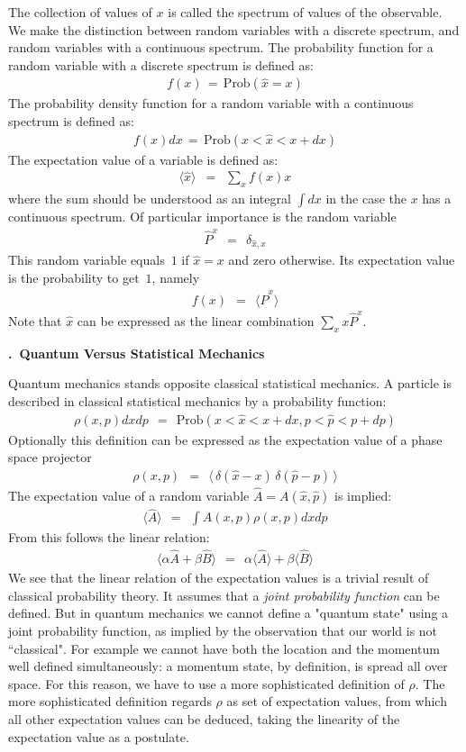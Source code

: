 \documentclass[onecolumn,fleqn, 11pt]{revtex4}
\newcommand{\beq}{\begin{eqnarray}}
\newcommand{\eeq}{\end{eqnarray}}
\renewcommand{\thesubsection}{\arabic{subsection}}
\renewcommand{\thesubsubsection}{\arabic{subsubsection}}
\newcommand{\sheadC}[1]
{
\addtocounter{subsubsection}{1}
\vspace{5mm}
{\bf \thesubsection.\thesubsubsection \ #1}  
\nopagebreak
\phantomsection
}
\begin{document}
The collection of values of ${x}$ is called the spectrum 
of values of the observable. We make the distinction 
between random variables with a discrete spectrum, 
and random variables with a continuous spectrum. 
The probability function for a random variable 
with a discrete spectrum is defined as:
\beq
f (x) \,=\, \mbox{Prob}( \hat{x} =x ) 
\eeq
The probability density function for a random 
variable with a continuous spectrum is defined as:
\beq
f(x)dx \, = \, \mbox{Prob}( x < \hat{x}< x+dx ) 
\eeq
The expectation value of a variable is defined as:
\beq
\langle \hat{x} \rangle \,\,\,=\,\,\, 
\sum_x f(x) x  
\eeq
where the sum should be understood 
as an integral $\int dx$ in the case 
the $x$ has a continuous spectrum. 
Of particular importance is the random variable  
\beq
\hat{P}^x \ \ = \ \ \delta_{\hat{x},x}
\eeq
This random variable equals~$1$ if ${\hat{x}=x}$ 
and zero otherwise. Its expectation value is the 
probability to get~$1$, namely 
\beq
f(x) \ \ = \ \ \langle \hat{P}^x \rangle 
\eeq
Note that $\hat{x}$ can be expressed as 
the linear combination $\sum_x x \hat{P}^x$. 


\sheadC{Quantum Versus Statistical Mechanics}

Quantum mechanics stands opposite classical statistical mechanics. 
A particle is described in classical statistical mechanics by a probability function:
\beq
\rho(x,p)dxdp \ \ = \ \ \mbox{Prob}( x < \hat{x}<x+dx, p < \hat{p} < p + dp) 
\eeq
Optionally this definition can be expressed as the expectation value 
of a phase space projector 
\beq
\rho(x,p) \ \ =  \ \ \langle \,\delta(\hat{x}-x)\,\delta(\hat{p}-p) \,\rangle
\eeq
The expectation value of a random 
variable ${\hat{A} = A(\hat{x}, \hat{p})}$ 
is implied:
\beq
\langle \hat{A} \rangle \ \ = \ \ \int A(x, p) \rho(x, p) dxdp 
\eeq
From this follows the linear relation:
\beq
\langle \alpha \hat{A} + \beta \hat{B} \rangle 
\ \ = \ \ \alpha \langle \hat{A}\rangle + \beta \langle \hat{B} \rangle
\eeq
We see that the linear relation of the expectation 
values is a trivial result of classical probability 
theory. It assumes that a {\em joint probability function}  
can be defined. But in quantum mechanics we 
cannot define a "quantum state" using a joint 
probability function, as implied by the observation  
that our world is not ``classical". For example 
we cannot have both the location and the momentum 
well defined simultaneously: a momentum state, 
by definition, is spread all over space.
For this reason, we have to use a more sophisticated 
definition of ${\rho}$. The more sophisticated definition 
regards $\rho$ as set of expectation values,
from which all other expectation values can be deduced,    
taking the linearity of the expectation value as a postulate. 
\end{document}

